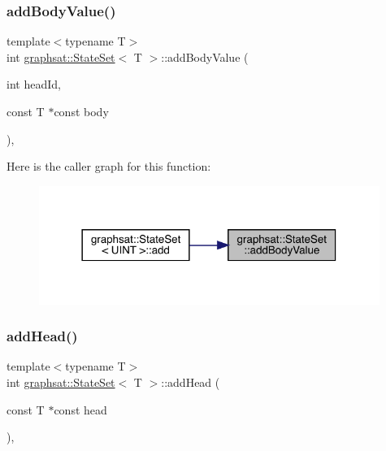 \subsubsection{\texorpdfstring{addBodyValue()}{addBodyValue()}}
{\footnotesize\ttfamily template$<$typename T$>$ \\
int \mbox{\hyperlink{classgraphsat_1_1_state_set}{graphsat\+::\+State\+Set}}$<$ T $>$\+::add\+Body\+Value (\begin{DoxyParamCaption}\item[{int}]{head\+Id,  }\item[{const T $\ast$const}]{body }\end{DoxyParamCaption})\hspace{0.3cm}{\ttfamily [inline]}, {\ttfamily [private]}}

Here is the caller graph for this function\+:
\nopagebreak
\begin{figure}[H]
\begin{center}
\leavevmode
\includegraphics[width=314pt]{classgraphsat_1_1_state_set_a2a7f602339d0ef9c428da2333a93199f_icgraph}
\end{center}
\end{figure}
\mbox{\label{classgraphsat_1_1_state_set_a3d7046e995575e5bf9806b174ec75a65}} 
\subsubsection{\texorpdfstring{addHead()}{addHead()}}
{\footnotesize\ttfamily template$<$typename T$>$ \\
int \mbox{\hyperlink{classgraphsat_1_1_state_set}{graphsat\+::\+State\+Set}}$<$ T $>$\+::add\+Head (\begin{DoxyParamCaption}\item[{const T $\ast$const}]{head }\end{DoxyParamCaption})\hspace{0.3cm}{\ttfamily [inline]}, {\ttfamily [private]}}

